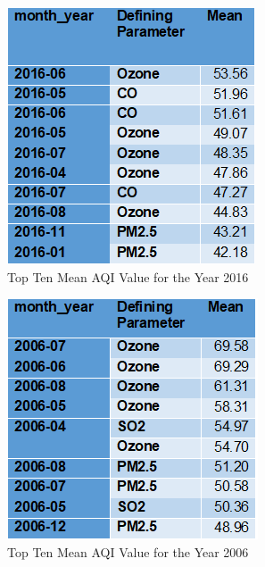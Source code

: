 \documentclass[sigconf]{acmart}
\begin{document}
\begin{figure}[htb]
\includegraphics[width=1.0\columnwidth]{images/top10meanaqi2016.png}
  \caption{Top Ten Mean AQI Value for the Year 2016}
  \label{Top Ten Mean AQI Value for the Year 2016}
\end{figure}

\begin{figure}[htb]
\includegraphics[width=1.0\columnwidth]{images/top10meanaqi2006.png}
  \caption{Top Ten Mean AQI Value for the Year 2006}
  \label{Top Ten Mean AQI Value for Year 2006}
\end{figure}
\end{document}
